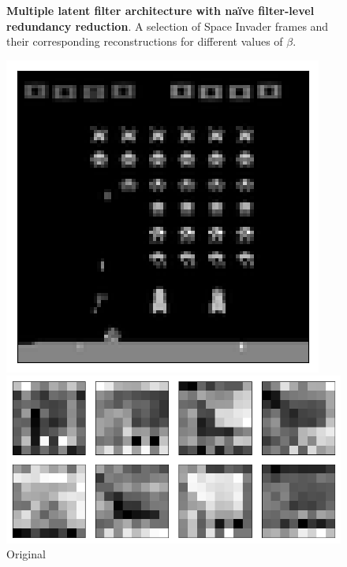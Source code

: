 \begin{figure}[h!]
\begin{multicols}{4}
    \caption{$\beta = 4$}
\end{multicols}
\caption{\textbf{Multiple latent filter architecture with na{\"i}ve filter-level redundancy reduction}. A selection of Space Invader frames and their corresponding reconstructions for different values of $\beta$.}
\label{fig:naive_average_originals_and_reconstructions}
\end{figure}



\begin{figure}[h!]
\centering
\captionsetup{justification=centering}
\begin{minipage}{0.4\textwidth}
\centering
\captionsetup{justification=centering}
\includegraphics[scale=0.4]{figures/results/naive_average/beta_1_sample_3_original.png}
\caption{Original}
\end{minipage}
\begin{minipage}{0.55\textwidth}
\centering
\captionsetup{justification=centering}
\includegraphics[scale=0.42]{figures/results/naive_average/beta_1_convolutional_layers_sample_3.png}

\end{minipage}
\end{figure}
